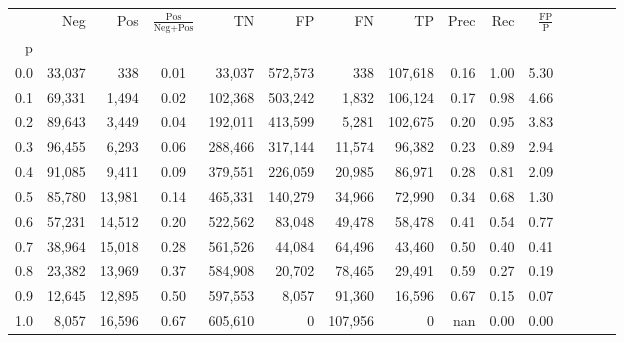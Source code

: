 \begin{tabular}{rrrcrrrrrrrrrrr}
\toprule
{} &     Neg &     Pos & $\frac{\text{Pos}}{\text{Neg}+\text{Pos}}$ &       TN &       FP &       FN &       TP &  Prec &   Rec & $\frac{\text{FP}}{\text{P}}$ \\
p   &         &         &                                            &          &          &          &          &       &       &                              \\
\midrule
0.0 &  33,037 &     338 &                                       0.01 &   33,037 &  572,573 &      338 &  107,618 &  0.16 &  1.00 &                         5.30 \\
0.1 &  69,331 &   1,494 &                                       0.02 &  102,368 &  503,242 &    1,832 &  106,124 &  0.17 &  0.98 &                         4.66 \\
0.2 &  89,643 &   3,449 &                                       0.04 &  192,011 &  413,599 &    5,281 &  102,675 &  0.20 &  0.95 &                         3.83 \\
0.3 &  96,455 &   6,293 &                                       0.06 &  288,466 &  317,144 &   11,574 &   96,382 &  0.23 &  0.89 &                         2.94 \\
0.4 &  91,085 &   9,411 &                                       0.09 &  379,551 &  226,059 &   20,985 &   86,971 &  0.28 &  0.81 &                         2.09 \\
0.5 &  85,780 &  13,981 &                                       0.14 &  465,331 &  140,279 &   34,966 &   72,990 &  0.34 &  0.68 &                         1.30 \\
0.6 &  57,231 &  14,512 &                                       0.20 &  522,562 &   83,048 &   49,478 &   58,478 &  0.41 &  0.54 &                         0.77 \\
0.7 &  38,964 &  15,018 &                                       0.28 &  561,526 &   44,084 &   64,496 &   43,460 &  0.50 &  0.40 &                         0.41 \\
0.8 &  23,382 &  13,969 &                                       0.37 &  584,908 &   20,702 &   78,465 &   29,491 &  0.59 &  0.27 &                         0.19 \\
0.9 &  12,645 &  12,895 &                                       0.50 &  597,553 &    8,057 &   91,360 &   16,596 &  0.67 &  0.15 &                         0.07 \\
1.0 &   8,057 &  16,596 &                                       0.67 &  605,610 &        0 &  107,956 &        0 &   nan &  0.00 &                         0.00 \\
\bottomrule
\end{tabular}

